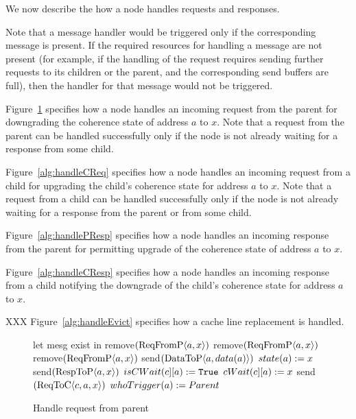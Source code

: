 We now describe the how a node handles requests and responses.

Note
that a message handler would be triggered only if the corresponding message is
present. If the required resources for handling a message are not present (for
example, if the handling of the request requires sending further requests to
its children or the parent, and the corresponding send buffers are full), then
the handler for that message would not be triggered.

Figure~\ref{alg:handlePReq} specifies how a node handles an incoming request
from the parent for downgrading the coherence state of address $a$ to $x$. Note
that a request from the parent can be handled successfully only if the node is
not already waiting for a response from some child.

Figure~\ref{alg:handleCReq} specifies how a node handles an incoming request
from a child for upgrading the child's coherence state for address $a$ to $x$.
Note that a request from a child can be handled successfully only if the node
is not already waiting for a response from the parent or from some child.

Figure~\ref{alg:handlePResp} specifies how a node handles an incoming response
from the parent for permitting upgrade of the coherence state of address $a$ to
$x$.

Figure~\ref{alg:handleCResp} specifies how a node handles an incoming response
from a child notifying the downgrade of the child's coherence state for address
$a$ to $x$.

XXX Figure~\ref{alg:handleEvict} specifies how a cache line replacement is handled.


\begin{figure}
\begin{algorithmic}
   \State let mesg  exist in 
   \If {$\forall c, !isCWait(c][a)$}
        \State remove$(\text{ReqFromP$\langle a,x\rangle$})$
     \State remove$(\text{ReqFromP$\langle a,x\rangle$})$
     \ElsIf {$\forall c, dir(c][a) \le x$}
        \State remove$(\text{ReqFromP$\langle a,x\rangle$})$
           \State send$(\text{DataToP$\langle a,data(a)\rangle$})$
        \EndIf
        \State $state(a) := x$
        \State send$(\text{RespToP$\langle a,x\rangle$})$
     \Else
           \If {$dir(c][a) > x$}
              \State $isCWait(c][a) := \texttt{True}$
              \State $cWait(c][a) := x$
              \State send$(\text{ReqToC$\langle c,a,x\rangle$})$
           \EndIf
        \EndFor
        \State \textcolor{trig-color}{$whoTrigger(a) := Parent$}
     \EndIf
   \EndIf
\EndRule
\end{algorithmic}
\caption{Handle request from parent}
\label{alg:handlePReq}
\end{figure}

